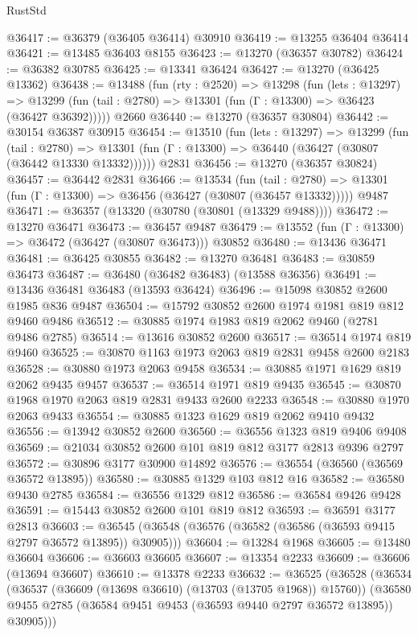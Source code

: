 \begin{lexlean}{RustStd}
\begin{coremodule}
@36417 := @36379 (@36405 @36414) @30910
@36419 := @13255 @36404 @36414
@36421 := @13485 @36403 @8155
@36423 := @13270 (@36357 @30782)
@36424 := @36382 @30785
@36425 := @13341 @36424
@36427 := @13270 (@36425 @13362)
@36438 := @13488
    (fun (rty : @2520) =>
    @13298
      (fun (lets : @13297) =>
      @13299 (fun (tail : @2780) => @13301 (fun (Γ : @13300) => @36423 (@36427 @36392)))))
    @2660
@36440 := @13270 (@36357 @30804)
@36442 := @30154 @36387 @30915
@36454 := @13510
    (fun (lets : @13297) =>
    @13299
      (fun (tail : @2780) =>
      @13301 (fun (Γ : @13300) => @36440 (@36427 (@30807 (@36442 @13330 @13332))))))
    @2831
@36456 := @13270 (@36357 @30824)
@36457 := @36442 @2831
@36466 := @13534
    (fun (tail : @2780) => @13301 (fun (Γ : @13300) => @36456 (@36427 (@30807 (@36457 @13332)))))
    @9487
@36471 := @36357 (@13320 (@30780 (@30801 (@13329 @9488))))
@36472 := @13270 @36471
@36473 := @36457 @9487
@36479 := @13552 (fun (Γ : @13300) => @36472 (@36427 (@30807 @36473))) @30852
@36480 := @13436 @36471
@36481 := @36425 @30855
@36482 := @13270 @36481
@36483 := @30859 @36473
@36487 := @36480 (@36482 @36483) (@13588 @36356)
@36491 := @13436 @36481 @36483 (@13593 @36424)
@36496 := @15098 @30852 @2600 @1985 @836 @9487
@36504 := @15792 @30852 @2600 @1974 @1981 @819 @812 @9460 @9486
@36512 := @30885 @1974 @1983 @819 @2062 @9460 (@2781 @9486 @2785)
@36514 := @13616 @30852 @2600
@36517 := @36514 @1974 @819 @9460
@36525 := @30870 @1163 @1973 @2063 @819 @2831 @9458 @2600 @2183
@36528 := @30880 @1973 @2063 @9458
@36534 := @30885 @1971 @1629 @819 @2062 @9435 @9457
@36537 := @36514 @1971 @819 @9435
@36545 := @30870 @1968 @1970 @2063 @819 @2831 @9433 @2600 @2233
@36548 := @30880 @1970 @2063 @9433
@36554 := @30885 @1323 @1629 @819 @2062 @9410 @9432
@36556 := @13942 @30852 @2600
@36560 := @36556 @1323 @819 @9406 @9408
@36569 := @21034 @30852 @2600 @101 @819 @812 @3177 @2813 @9396 @2797
@36572 := @30896 @3177 @30900 @14892
@36576 := @36554 (@36560 (@36569 @36572 @13895))
@36580 := @30885 @1329 @103 @812 @16
@36582 := @36580 @9430 @2785
@36584 := @36556 @1329 @812
@36586 := @36584 @9426 @9428
@36591 := @15443 @30852 @2600 @101 @819 @812
@36593 := @36591 @3177 @2813
@36603 := @36545 (@36548 (@36576 (@36582 (@36586 (@36593 @9415 @2797 @36572 @13895)) @30905)))
@36604 := @13284 @1968
@36605 := @13480 @36604
@36606 := @36603 @36605
@36607 := @13354 @2233
@36609 := @36606 (@13694 @36607)
@36610 := @13378 @2233
@36632 := @36525
    (@36528
      (@36534
        (@36537 (@36609 (@13698 @36610) (@13703 (@13705 @1968)) @15760))
        (@36580 @9455 @2785 (@36584 @9451 @9453 (@36593 @9440 @2797 @36572 @13895)) @30905)))

\end{coremodule}
\end{lexlean}
